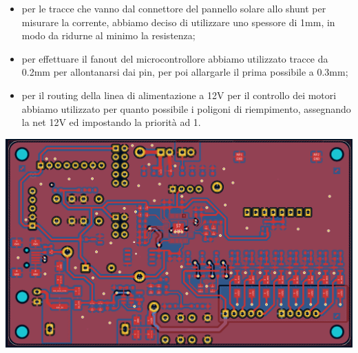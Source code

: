 \begin{itemize}
\item
  
  per le tracce che vanno dal connettore del pannello solare allo shunt
  per misurare la corrente, abbiamo deciso di utilizzare uno spessore di
  1mm, in modo da ridurne al minimo la resistenza;
  
\item
  
  per effettuare il fanout del microcontrollore abbiamo utilizzato
  tracce da 0.2mm per allontanarsi dai pin, per poi allargarle il prima
  possibile a 0.3mm;
  
\item
  
  per il routing della linea di alimentazione a 12V per il controllo dei
  motori abbiamo utilizzato per quanto possibile i poligoni di
  riempimento, assegnando la net 12V ed impostando la priorità ad 1.
  
\end{itemize}

\begin{center}
\includegraphics[scale=0.2]{figures/image77.png}
\captionsetup{type=figure}
\end{center}

